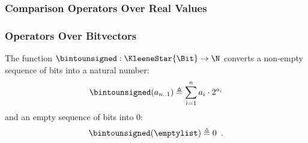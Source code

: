 \subsubsection{Comparison Operators Over Real Values \label{sec:ComparisonOverReal}}
\begin{mathpar}
\end{mathpar}

\begin{mathpar}
\end{mathpar}

\begin{mathpar}
\end{mathpar}

\begin{mathpar}
\end{mathpar}

\begin{mathpar}
\end{mathpar}

\begin{mathpar}
\end{mathpar}

\subsubsection{Operators Over Bitvectors \label{sec:BitvectorOperations}}
\hypertarget{relation-bintounsigned}{}
The function $\bintounsigned : \KleeneStar{\Bit} \rightarrow \N$ converts a non-empty sequence of bits
into a natural number:
\[
  \bintounsigned(a_{n..1}) \triangleq \sum_{i=1}^n a_i \cdot 2^{a_i}
\]
and an empty sequence of bits into $0$:
\[
  \bintounsigned(\emptylist) \triangleq 0 \enspace.
\]

